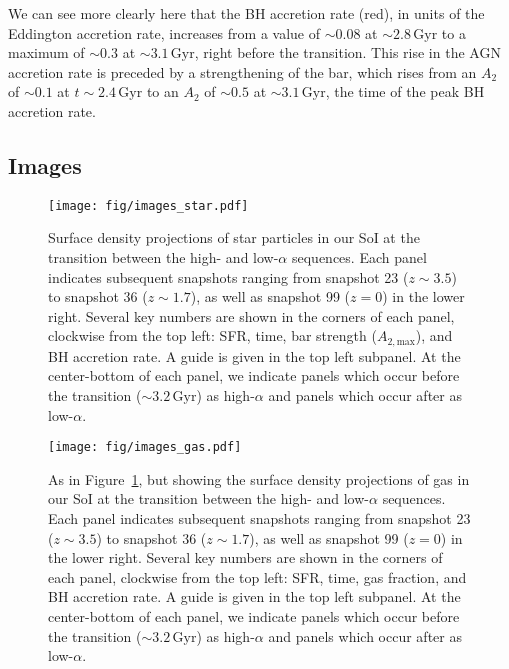 \documentclass[linenumbers, twocolumn]{aastex631}
\newcommand{\Gyr}{\ensuremath{\textrm{Gyr}}}
\begin{document}
We can see more clearly here that the BH accretion rate (red), in units of the Eddington accretion rate, increases from a value of $\sim0.08$ at $\sim2.8\,\Gyr$ to a maximum of $\sim0.3$ at $\sim3.1\,\Gyr$, right before the transition. This rise in the AGN accretion rate is preceded by a strengthening of the bar, which rises from an $A_2$ of $\sim0.1$ at $t\sim2.4\,\Gyr$ to an $A_2$ of $\sim0.5$ at $\sim3.1\,\Gyr$, the time of the peak BH accretion rate.

\subsection{Images}\label{ssec:images}
\begin{figure*}
  \centering
  \texttt{[image: fig/images\_star.pdf]}
  \caption{Surface density projections of star particles in our SoI at the transition between the high- and low-$\alpha$ sequences. Each panel indicates subsequent snapshots ranging from snapshot 23 ($z\sim3.5$) to snapshot 36 ($z\sim1.7$), as well as snapshot 99 ($z=0$) in the lower right. Several key numbers are shown in the corners of each panel, clockwise from the top left: SFR, time, bar strength ($A_{2,\textrm{max}}$), and BH accretion rate. A guide is given in the top left subpanel. At the center-bottom of each panel, we indicate panels which occur before the transition ($\sim3.2\,\Gyr$) as high-$\alpha$ and panels which occur after as low-$\alpha$.}
  \label{fig:images_star}
\end{figure*}

\begin{figure*}
  \centering
  \texttt{[image: fig/images\_gas.pdf]}
  \caption{As in Figure~\ref{fig:images_star}, but showing the surface density projections of gas in our SoI at the transition between the high- and low-$\alpha$ sequences. Each panel indicates subsequent snapshots ranging from snapshot 23 ($z\sim3.5$) to snapshot 36 ($z\sim1.7$), as well as snapshot 99 ($z=0$) in the lower right. Several key numbers are shown in the corners of each panel, clockwise from the top left: SFR, time, gas fraction, and BH accretion rate. A guide is given in the top left subpanel. At the center-bottom of each panel, we indicate panels which occur before the transition ($\sim3.2\,\Gyr$) as high-$\alpha$ and panels which occur after as low-$\alpha$.}
  \label{fig:images_gas}
\end{figure*}
\end{document}
